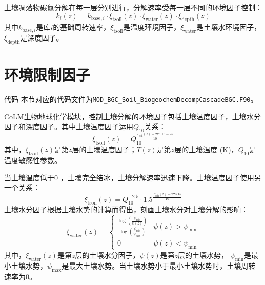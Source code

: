 土壤凋落物碳氮分解在每一层分别进行，分解速率受每一层不同的环境因子控制：
\begin{equation}
  k_{i}(z)=k_{\mathrm{base},i} \cdot \xi_{\mathrm{tsoil}}(z) \cdot \xi_{\mathrm{water}}(z) \cdot \xi_{\mathrm{depth}}(z)
\end{equation}
其中$k_{\mathrm{base},i}$是库$i$的基础周转速率，$\xi_{\mathrm{tsoil}}$是温度环境因子，$\xi_{\mathrm{water}}$是土壤水环境因子，$\xi_{\mathrm{depth}}$是深度因子。


\section{环境限制因子}\label{环境限制因子}

\begin{mymdframed}{代码}
  本节对应的代码文件为\texttt{MOD\_BGC\_Soil\_BiogeochemDecompCascadeBGC.F90}。
\end{mymdframed}

CoLM生物地球化学模块，控制土壤分解的环境因子包括土壤温度因子，土壤水分因子和深度因子。其中土壤温度因子运用$Q_{10}$关系：
\begin{equation}
  \xi_{\mathrm{t s o i l}}(z)=Q_{10}^{\frac{T_{\mathrm{{soil }}}(z)-273.15-25}{10}}
\end{equation}
其中，$\xi_{\mathrm{tsoil}}\left(z\right)$是第$z$层的土壤温度因子；$T\left(z\right)$是第$z$层的土壤温度 (K)，$Q_{10}$是温度敏感性参数。


当土壤温度低于0 \textcelsius，土壤完全结冰，土壤分解速率迅速下降。土壤温度因子使用另一个关系：
\begin{equation}
  \xi_{\mathrm{t s o i l}}(z)=Q_{10}^{-2.5} \cdot 1.5^{\frac{T_{\mathrm{{soil }}}(z)-273.15}{10}}
\end{equation}
土壤水分因子根据土壤水势的计算而得出，刻画土壤水分对土壤分解的影响：
\begin{equation}
  \xi_{\mathrm{w a t e r}}(z)=\begin{cases}
    \frac{\log \left(\frac{\psi_{\min }}{\psi(z)}\right)}{\log \left(\frac{\psi_{\min }}{\psi_{\max }}\right)}
    & \psi(\mathrm{z})>\psi_{\min } \\
    0  & \psi(z)<\psi_{\min }
  \end{cases}
\end{equation}
其中，$\xi_{\mathrm{water}}\left(z\right)$是第$z$层的土壤水分因子，$\psi\left(z\right)$是第$z$层的土壤水势，
$\psi_{\mathrm{min}}$是最小土壤水势，$\psi_{\mathrm{max}}$是最大土壤水势。当土壤水势小于最小土壤水势时，土壤周转速率为0。


